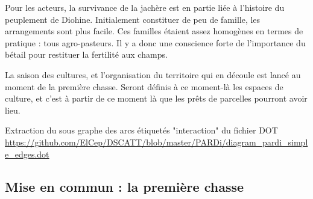 Pour les acteurs, la survivance de la jachère est en partie liée à l'histoire du peuplement de Diohine. Initialement constituer de peu de famille, les arrangements sont plus facile. Ces familles étaient assez homogènes en termes de pratique : tous agro-pasteurs. Il y a donc une conscience forte de l'importance du bétail pour restituer la fertilité aux champs.

La saison des cultures, et l'organisation du territoire qui en découle est lancé au moment de la première chasse. Seront définis à ce moment-là les espaces de culture, et c'est à partir de ce moment là que les prêts de parcelles pourront avoir lieu.

Extraction du sous graphe des arcs étiquetés  "interaction" du fichier DOT \url{https://github.com/ElCep/DSCATT/blob/master/PARDi/diagram_pardi_simple_edges.dot}

 \subsection{Mise en commun : la première chasse}\label{sec:premierchasse}




